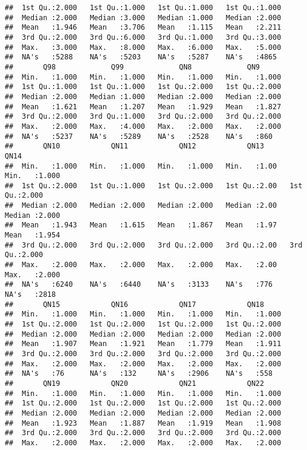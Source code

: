\documentclass[
]{article}
\begin{document}
\begin{verbatim}
##  1st Qu.:2.000   1st Qu.:1.000   1st Qu.:1.000   1st Qu.:1.000  
##  Median :2.000   Median :3.000   Median :1.000   Median :2.000  
##  Mean   :1.946   Mean   :3.706   Mean   :1.115   Mean   :2.211  
##  3rd Qu.:2.000   3rd Qu.:6.000   3rd Qu.:1.000   3rd Qu.:3.000  
##  Max.   :3.000   Max.   :8.000   Max.   :6.000   Max.   :5.000  
##  NA's   :5288    NA's   :5203    NA's   :5287    NA's   :4865   
##       Q98             Q99             QN8             QN9       
##  Min.   :1.000   Min.   :1.000   Min.   :1.000   Min.   :1.000  
##  1st Qu.:1.000   1st Qu.:1.000   1st Qu.:2.000   1st Qu.:2.000  
##  Median :2.000   Median :1.000   Median :2.000   Median :2.000  
##  Mean   :1.621   Mean   :1.207   Mean   :1.929   Mean   :1.827  
##  3rd Qu.:2.000   3rd Qu.:1.000   3rd Qu.:2.000   3rd Qu.:2.000  
##  Max.   :2.000   Max.   :4.000   Max.   :2.000   Max.   :2.000  
##  NA's   :5237    NA's   :5289    NA's   :2528    NA's   :860    
##       QN10            QN11            QN12            QN13           QN14      
##  Min.   :1.000   Min.   :1.000   Min.   :1.000   Min.   :1.00   Min.   :1.000  
##  1st Qu.:2.000   1st Qu.:1.000   1st Qu.:2.000   1st Qu.:2.00   1st Qu.:2.000  
##  Median :2.000   Median :2.000   Median :2.000   Median :2.00   Median :2.000  
##  Mean   :1.943   Mean   :1.615   Mean   :1.867   Mean   :1.97   Mean   :1.954  
##  3rd Qu.:2.000   3rd Qu.:2.000   3rd Qu.:2.000   3rd Qu.:2.00   3rd Qu.:2.000  
##  Max.   :2.000   Max.   :2.000   Max.   :2.000   Max.   :2.00   Max.   :2.000  
##  NA's   :6240    NA's   :6440    NA's   :3133    NA's   :776    NA's   :2818   
##       QN15            QN16            QN17            QN18      
##  Min.   :1.000   Min.   :1.000   Min.   :1.000   Min.   :1.000  
##  1st Qu.:2.000   1st Qu.:2.000   1st Qu.:2.000   1st Qu.:2.000  
##  Median :2.000   Median :2.000   Median :2.000   Median :2.000  
##  Mean   :1.907   Mean   :1.921   Mean   :1.779   Mean   :1.911  
##  3rd Qu.:2.000   3rd Qu.:2.000   3rd Qu.:2.000   3rd Qu.:2.000  
##  Max.   :2.000   Max.   :2.000   Max.   :2.000   Max.   :2.000  
##  NA's   :76      NA's   :132     NA's   :2906    NA's   :558    
##       QN19            QN20            QN21            QN22      
##  Min.   :1.000   Min.   :1.000   Min.   :1.000   Min.   :1.000  
##  1st Qu.:2.000   1st Qu.:2.000   1st Qu.:2.000   1st Qu.:2.000  
##  Median :2.000   Median :2.000   Median :2.000   Median :2.000  
##  Mean   :1.923   Mean   :1.887   Mean   :1.919   Mean   :1.908  
##  3rd Qu.:2.000   3rd Qu.:2.000   3rd Qu.:2.000   3rd Qu.:2.000  
##  Max.   :2.000   Max.   :2.000   Max.   :2.000   Max.   :2.000  

\end{verbatim}
\end{document}
